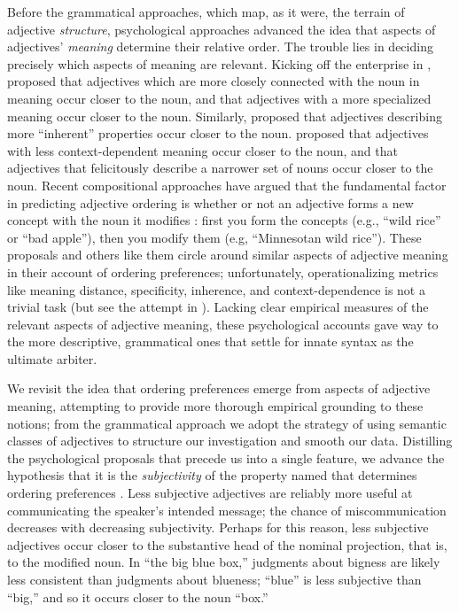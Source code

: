 \documentclass[12pt]{article}
\begin{document}
Before the grammatical approaches, which map, as it were, the terrain of adjective \emph{structure}, psychological approaches advanced the idea that aspects of adjectives' \emph{meaning} determine their relative order. The trouble lies in deciding precisely which aspects of meaning are relevant. 
Kicking off the enterprise in \citeyear{sweet1898}, \citeauthor{sweet1898} proposed that adjectives which are more closely connected with the noun in meaning occur closer to the noun, and that adjectives with a more specialized meaning occur closer to the noun. Similarly, \cite{whorf1945} proposed that adjectives describing more ``inherent'' properties occur closer to the noun. \cite{ziff1960} proposed that adjectives with less context-dependent meaning occur closer to the noun, and that adjectives that felicitously describe a narrower set of nouns occur closer to the noun. Recent compositional approaches have argued that the fundamental factor in predicting adjective ordering is whether or not an adjective forms a new concept with the noun it modifies \citep{McNally2004,svenonius2008}: first you form the concepts (e.g., ``wild rice'' or ``bad apple''), then you modify them (e.g, ``Minnesotan wild rice'').  These proposals and others like them circle around similar aspects of adjective meaning in their account of ordering preferences; unfortunately, operationalizing metrics like meaning distance, specificity, inherence, and context-dependence is not a trivial task (but see the attempt in \citealp{martin1969}). 
Lacking clear empirical measures of the relevant aspects of adjective meaning, these psychological accounts gave way to the more descriptive, grammatical ones that settle for innate syntax as the ultimate arbiter. 

We revisit the idea that ordering preferences emerge from aspects of adjective meaning, attempting to provide more thorough empirical grounding to these notions;
from the grammatical approach we adopt the strategy of using semantic classes of adjectives to structure our investigation and smooth our data. 
Distilling the psychological proposals that precede us into a single feature, we advance the hypothesis that it is the \emph{subjectivity} of the property named that determines ordering preferences \citep{hetzron1978,Quirk1985,hill2012}.
Less subjective adjectives are reliably more useful at communicating the speaker's intended message; the chance of miscommunication decreases with decreasing subjectivity. 
Perhaps for this reason, less subjective adjectives occur closer to the substantive head of the nominal projection, that is, to the modified noun.  
In ``the big blue box,'' judgments about bigness are likely less consistent than judgments about blueness; ``blue'' is less subjective than ``big,'' and so it occurs closer to the noun ``box.''
\end{document}
